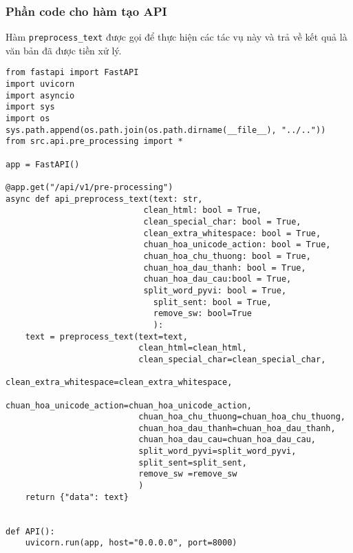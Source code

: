 \subsubsection{Phần code cho hàm tạo API}
Hàm \texttt{preprocess\_text} được gọi để thực hiện các tác vụ này và trả về kết quả là văn bản đã được tiền xử lý.
\begin{verbatim}
from fastapi import FastAPI
import uvicorn
import asyncio
import sys
import os
sys.path.append(os.path.join(os.path.dirname(__file__), "../.."))
from src.api.pre_processing import *

app = FastAPI()

@app.get("/api/v1/pre-processing")
async def api_preprocess_text(text: str,
                            clean_html: bool = True,
                            clean_special_char: bool = True,
                            clean_extra_whitespace: bool = True,
                            chuan_hoa_unicode_action: bool = True,
                            chuan_hoa_chu_thuong: bool = True,
                            chuan_hoa_dau_thanh: bool = True,
                            chuan_hoa_dau_cau:bool = True,
                            split_word_pyvi: bool = True,
                              split_sent: bool = True,
                              remove_sw: bool=True
                              ):
    text = preprocess_text(text=text,
                           clean_html=clean_html,
                           clean_special_char=clean_special_char,
                           clean_extra_whitespace=clean_extra_whitespace,
                           chuan_hoa_unicode_action=chuan_hoa_unicode_action,
                           chuan_hoa_chu_thuong=chuan_hoa_chu_thuong,
                           chuan_hoa_dau_thanh=chuan_hoa_dau_thanh,
                           chuan_hoa_dau_cau=chuan_hoa_dau_cau,
                           split_word_pyvi=split_word_pyvi,
                           split_sent=split_sent,
                           remove_sw =remove_sw
                           )
    return {"data": text}


def API():
    uvicorn.run(app, host="0.0.0.0", port=8000)
\end{verbatim}
